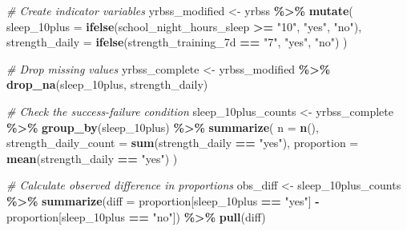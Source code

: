 \documentclass[
]{article}
\newenvironment{Shaded}{\begin{snugshade}}{\end{snugshade}}
\newcommand{\AttributeTok}[1]{\textcolor[rgb]{0.13,0.29,0.53}{#1}}
\newcommand{\CommentTok}[1]{\textcolor[rgb]{0.56,0.35,0.01}{\textit{#1}}}
\newcommand{\FunctionTok}[1]{\textcolor[rgb]{0.13,0.29,0.53}{\textbf{#1}}}
\newcommand{\NormalTok}[1]{#1}
\newcommand{\OtherTok}[1]{\textcolor[rgb]{0.56,0.35,0.01}{#1}}
\newcommand{\SpecialCharTok}[1]{\textcolor[rgb]{0.81,0.36,0.00}{\textbf{#1}}}
\newcommand{\StringTok}[1]{\textcolor[rgb]{0.31,0.60,0.02}{#1}}
\begin{document}
\begin{Shaded}
\begin{Highlighting}[]
\CommentTok{\# Create indicator variables}
\NormalTok{yrbss\_modified }\OtherTok{\textless{}{-}}\NormalTok{ yrbss }\SpecialCharTok{\%\textgreater{}\%}
  \FunctionTok{mutate}\NormalTok{(}
    \AttributeTok{sleep\_10plus =} \FunctionTok{ifelse}\NormalTok{(school\_night\_hours\_sleep }\SpecialCharTok{\textgreater{}=} \StringTok{"10"}\NormalTok{, }\StringTok{"yes"}\NormalTok{, }\StringTok{"no"}\NormalTok{),}
    \AttributeTok{strength\_daily =} \FunctionTok{ifelse}\NormalTok{(strength\_training\_7d }\SpecialCharTok{==} \StringTok{"7"}\NormalTok{, }\StringTok{"yes"}\NormalTok{, }\StringTok{"no"}\NormalTok{)}
\NormalTok{  )}
\end{Highlighting}
\end{Shaded}

\begin{Shaded}
\begin{Highlighting}[]
\CommentTok{\# Drop missing values}
\NormalTok{yrbss\_complete }\OtherTok{\textless{}{-}}\NormalTok{ yrbss\_modified }\SpecialCharTok{\%\textgreater{}\%}
  \FunctionTok{drop\_na}\NormalTok{(sleep\_10plus, strength\_daily)}
\end{Highlighting}
\end{Shaded}

\begin{Shaded}
\begin{Highlighting}[]
\CommentTok{\# Check the success{-}failure condition}
\NormalTok{sleep\_10plus\_counts }\OtherTok{\textless{}{-}}\NormalTok{ yrbss\_complete }\SpecialCharTok{\%\textgreater{}\%}
  \FunctionTok{group\_by}\NormalTok{(sleep\_10plus) }\SpecialCharTok{\%\textgreater{}\%}
  \FunctionTok{summarize}\NormalTok{(}
    \AttributeTok{n =} \FunctionTok{n}\NormalTok{(),}
    \AttributeTok{strength\_daily\_count =} \FunctionTok{sum}\NormalTok{(strength\_daily }\SpecialCharTok{==} \StringTok{"yes"}\NormalTok{),}
    \AttributeTok{proportion =} \FunctionTok{mean}\NormalTok{(strength\_daily }\SpecialCharTok{==} \StringTok{"yes"}\NormalTok{)}
\NormalTok{  )}
\end{Highlighting}
\end{Shaded}

\begin{Shaded}
\begin{Highlighting}[]
\CommentTok{\# Calculate observed difference in proportions}
\NormalTok{obs\_diff }\OtherTok{\textless{}{-}}\NormalTok{ sleep\_10plus\_counts }\SpecialCharTok{\%\textgreater{}\%}
  \FunctionTok{summarize}\NormalTok{(}\AttributeTok{diff =}\NormalTok{ proportion[sleep\_10plus }\SpecialCharTok{==} \StringTok{"yes"}\NormalTok{] }\SpecialCharTok{{-}}\NormalTok{ proportion[sleep\_10plus }\SpecialCharTok{==} \StringTok{"no"}\NormalTok{]) }\SpecialCharTok{\%\textgreater{}\%}
  \FunctionTok{pull}\NormalTok{(diff)}
\end{Highlighting}
\end{Shaded}
\end{document}
